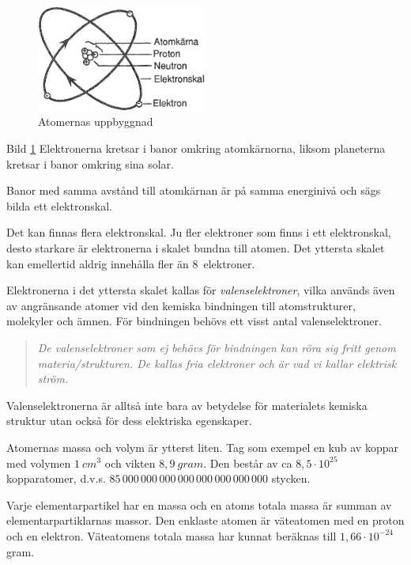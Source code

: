 \begin{figure}
  \includegraphics[width=0.5\textwidth]{images/cropped_pdfs/bild_2_1-01.pdf}
  \caption{Atomernas uppbyggnad}
  \label{fig:BildII1-1}
  \vspace{-20pt}
\end{figure}

Bild \ref{fig:BildII1-1}
Elektronerna kretsar i banor omkring atomkärnorna, liksom
planeterna kretsar i banor omkring sina solar.

Banor med samma avstånd till atomkärnan är på samma energinivå och sägs bilda
ett elektronskal.

Det kan finnas flera elektronskal. Ju fler elektroner som finns i ett
elektronskal, desto starkare är elektronerna i skalet bundna till atomen. Det
yttersta skalet kan emellertid aldrig innehålla fler än 8~elektroner.

Elektronerna i det yttersta skalet kallas för \emph{valenselektroner}, vilka
används även av angränsande atomer vid den kemiska bindningen till
atomstrukturer, molekyler och ämnen. För bindningen behövs ett visst antal
valenselektroner.

\begin{quote}\emph{
De valenselektroner som ej behövs för bindningen kan röra sig fritt genom
materia/strukturen. De kallas fria elektroner och är vad vi kallar elektrisk ström.
}\end{quote}

Valenselektronerna är alltså inte bara av betydelse för materialets kemiska
struktur utan också för dess elektriska egenskaper.

Atomernas massa och volym är ytterst liten. Tag som exempel en kub av koppar
med volymen \(1\ cm^3\) och vikten \(8,9\ gram\).
Den består av ca \(8,5 \cdot 10^{25}\) kopparatomer, d.v.s. \(85\, 000\, 000\, 000\, 000\, 000\, 000\, 000\, 000\) stycken.

Varje elementarpartikel har en massa och en atoms totala massa är summan av
elementarpartiklarnas massor. Den enklaste atomen är väteatomen med en proton
och en elektron. Väteatomens totala massa har kunnat beräknas till \(1,66 \cdot 10^{-24}\) gram.

